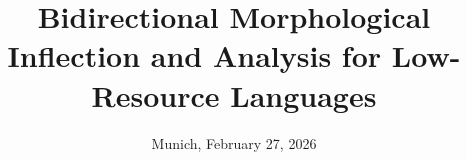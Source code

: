 



\newcommand{\Datum}{February 27, 2026}

\title{Bidirectional Morphological Inflection and Analysis for Low-Resource Languages}
\author{\PersonVorname{} \PersonNachname}
\date[\Datum]{Munich, \Datum}
\subject{Bachelor's Thesis Presentation}

\newcommand{\PraesentationTitelseiteAbstand}{55mm}


\PraesentationMasterStandard

\PraesentationTitelseite









%


